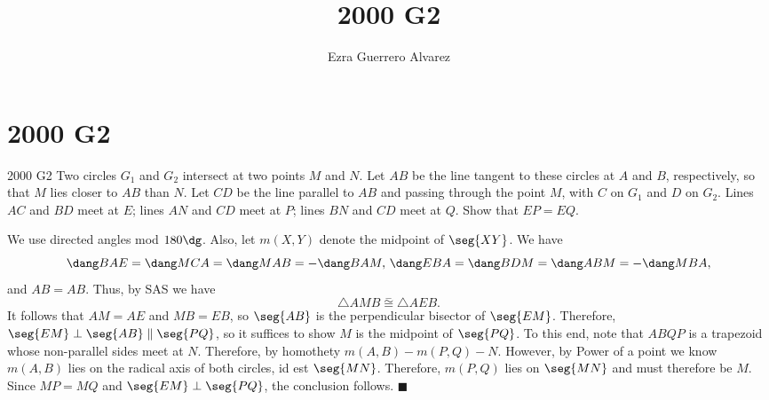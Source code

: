 \documentclass[14pt]{article}
\title{2000 G2}
\author{Ezra Guerrero Alvarez}
\begin{document}
\maketitle
	
\section*{2000 G2}

\begin{statement}{2000 G2}
	Two circles $ G_1$ and $ G_2$ intersect at two points $ M$ and $ N$. Let $ AB$ be the line tangent to these circles at $ A$ and $ B$, respectively, so that $ M$ lies closer to $ AB$ than $ N$. Let $ CD$ be the line parallel to $ AB$ and passing through the point $ M$, with $ C$ on $ G_1$ and $ D$ on $ G_2$. Lines $ AC$ and $ BD$ meet at $ E$; lines $ AN$ and $ CD$ meet at $ P$; lines $ BN$ and $ CD$ meet at $ Q$. Show that $ EP = EQ$.
\end{statement}
We use directed angles mod $180\dg$. Also, let $m(X,Y)$ denote the midpoint of $\seg{XY}$. We have
\[ \dang BAE = \dang MCA = \dang MAB = -\dang BAM,\,
\dang EBA = \dang BDM = \dang ABM = -\dang MBA, \]
and $AB=AB$. Thus, by SAS we have
\[ \triangle AMB \stackrel-\cong \triangle AEB. \]
It follows that $AM=AE$ and $MB=EB$, so $\seg{AB}$ is the perpendicular bisector of $\seg{EM}$. Therefore, $\seg{EM}\perp\seg{AB}\parallel\seg{PQ}$, so it suffices to show $M$ is the midpoint of $\seg{PQ}$. To this end, note that $ABQP$ is a trapezoid whose non-parallel sides meet at $N$. Therefore, by homothety $m(A,B)-m(P,Q)-N$. However, by Power of a point we know $m(A,B)$ lies on the radical axis of both circles, id est $\seg{MN}$. Therefore, $m(P,Q)$ lies on $\seg{MN}$ and must therefore be $M$. Since $MP=MQ$ and $\seg{EM}\perp\seg{PQ}$, the conclusion follows. $\blacksquare$
	
\end{document}
